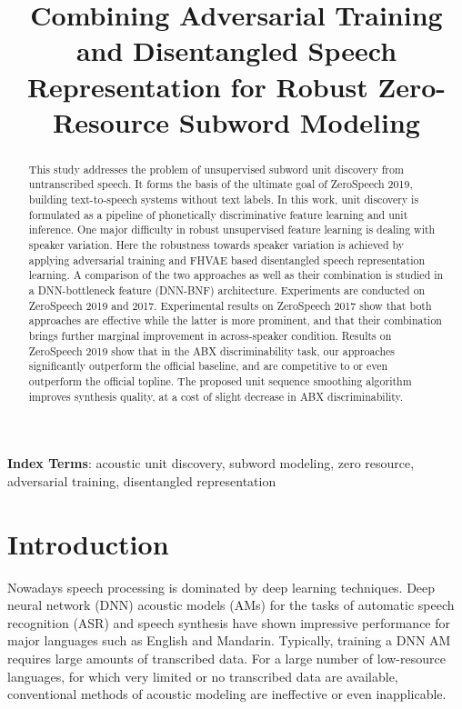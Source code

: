 \documentclass[a4paper]{article}
\title{Combining Adversarial Training and  Disentangled Speech Representation  for Robust Zero-Resource Subword Modeling}
\begin{document}
\maketitle
% 
\begin{abstract}
This study addresses the problem of unsupervised subword unit discovery from untranscribed speech. It forms the basis of the ultimate goal of ZeroSpeech 2019, building text-to-speech  systems without  text labels. In this work,  unit discovery  is formulated  as a pipeline of phonetically discriminative feature learning and unit inference. One major difficulty in robust unsupervised feature learning is dealing with speaker variation. Here the robustness towards speaker variation is achieved by applying adversarial training and FHVAE based disentangled speech representation learning. A comparison of the two approaches as well as their combination is studied in a DNN-bottleneck feature (DNN-BNF) architecture. Experiments are conducted on ZeroSpeech 2019 and 2017. Experimental results on ZeroSpeech 2017 show that both approaches are effective while the latter is more prominent, and that their combination brings further marginal improvement in across-speaker condition. Results on ZeroSpeech 2019 show that in the ABX discriminability task, our approaches significantly outperform the official baseline, and are competitive to or even outperform the official topline. The proposed unit sequence smoothing algorithm improves synthesis quality, at a cost of slight decrease in ABX discriminability.

\end{abstract}
\noindent\textbf{Index Terms}: acoustic unit discovery, subword modeling, zero resource, adversarial training, disentangled representation


\section{Introduction}
\label{sec:intro}
Nowadays speech processing is dominated by deep learning techniques. Deep neural network (DNN) acoustic models (AMs) for the tasks of  automatic speech recognition (ASR) and speech synthesis have shown impressive performance for major languages such as English and Mandarin. Typically, training a DNN AM requires large amounts of transcribed data. For a large number of low-resource languages, for which very limited or no transcribed data are available, conventional methods of acoustic modeling are ineffective or even inapplicable.
\end{document}
